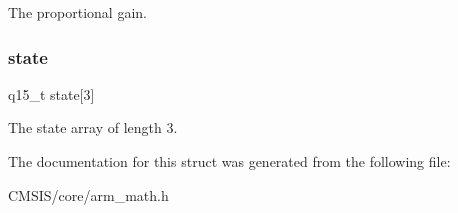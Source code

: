 The proportional gain. \mbox{\label{structarm__pid__instance__q15_a4c4e19d77015f5f7a31a1daf0faf31b6}} 
\subsubsection{\texorpdfstring{state}{state}}
{\footnotesize\ttfamily q15\+\_\+t state\mbox{[}3\mbox{]}}

The state array of length 3. 

The documentation for this struct was generated from the following file\+:\begin{DoxyCompactItemize}
\item 
C\+M\+S\+I\+S/core/arm\+\_\+math.\+h\end{DoxyCompactItemize}
